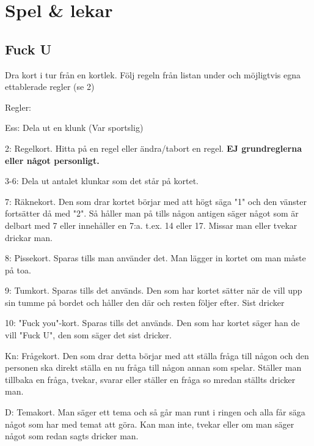 
\section{Spel \& lekar}

\pagestyle{Spel & lekar}



\subsection*{\textbf{Fuck U}}


Dra kort i tur från en kortlek. Följ regeln från listan under
och möjligtvis egna ettablerade regler (se 2)

Regler:

Ess: Dela ut en klunk (Var sportslig)

2: Regelkort. Hitta på en regel eller ändra/tabort en regel. \textbf{EJ grundreglerna eller något personligt.}

3-6: Dela ut antalet klunkar som det står på kortet.

7: Räknekort. Den som drar kortet börjar med att högt säga "1"
och den vänster fortsätter då med "2".
Så håller man på tills någon antigen säger något som är
delbart med 7 eller innehåller en 7:a. t.ex. 14 eller 17.
Missar man eller tvekar drickar man.

8: Pissekort. Sparas tills man använder det. Man lägger in kortet om man måste på toa.

9: Tumkort. Sparas tills det används.
Den som har kortet sätter när de vill upp sin tumme på bordet
och håller den där och resten följer efter.
Sist dricker

10: "Fuck you"-kort.
Sparas tills det används. Den som har kortet säger han de vill "Fuck U", den som säger det sist dricker.

Kn: Frågekort. Den som drar detta börjar med att ställa fråga till någon
och den personen ska direkt ställa en nu fråga till någon
annan som spelar. Ställer man tillbaka en fråga, tvekar, svarar
eller ställer en fråga so mredan ställts dricker man.

D: Temakort. Man säger ett tema och så går man runt i
ringen och alla får säga något som har med temat att göra.
Kan man inte, tvekar eller om man säger något som redan sagts dricker man.

